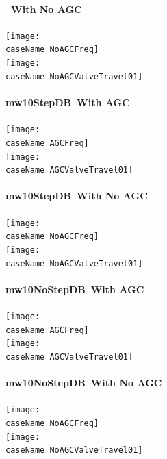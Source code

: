 \documentclass[12pt]{article}
\newcommand{\caseName}{ }
\begin{document}
\paragraph{\caseName\ With No AGC} 
\begin{center}
	\texttt{[image: \\caseName NoAGCFreq]} \\
	\texttt{[image: \\caseName NoAGCValveTravel01]} 
\end{center}
\pagebreak

\renewcommand{\caseName}{mw10StepDB}
\paragraph{\caseName\ With AGC} 
\begin{center}
	\texttt{[image: \\caseName AGCFreq]}\\
	\texttt{[image: \\caseName AGCValveTravel01]} \\
\end{center}
\paragraph{\caseName\ With No AGC} 
\begin{center}
	\texttt{[image: \\caseName NoAGCFreq]} \\
	\texttt{[image: \\caseName NoAGCValveTravel01]} 
\end{center}
\pagebreak

\renewcommand{\caseName}{mw10NoStepDB}
\paragraph{\caseName\ With AGC} 
\begin{center}
	\texttt{[image: \\caseName AGCFreq]}\\
	\texttt{[image: \\caseName AGCValveTravel01]} \\
\end{center}
\paragraph{\caseName\ With No AGC} 
\begin{center}
	\texttt{[image: \\caseName NoAGCFreq]} \\
	\texttt{[image: \\caseName NoAGCValveTravel01]} 
\end{center}
\pagebreak
\end{document}

